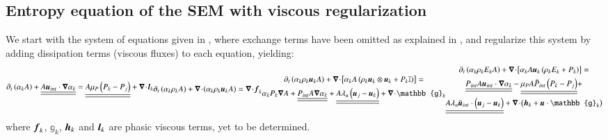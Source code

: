 \subsection{Entropy equation of the SEM with viscous regularization}\label{sec:ent-equ-sem}
%
We start with the system of equations given in , where exchange terms have been omitted as explained in ,
and regularize this system by adding dissipation terms (viscous fluxes) to each equation, yielding:
%
\begin{subequations}\label{eq:sev_equ-with-diss-terms}
\begin{align}\label{eq:sev_equ-with-diss-terms-vf}
\partial_t \left( \alpha_k  A\right) + \underline{\underline{A \mbold u_{int} \cdot \grad \alpha_k}} = \underline{\underline{A \mu_P \left( P_k - P_j \right)}} + \div \mbold l_k 
\end{align}
\begin{align}\label{eq:sev_equ-with-diss-terms-cont}
\partial_t \left( \alpha_k \rho_k A \right) + \div \left( \alpha_k \rho_k \mbold u_k A \right) = \div \mbold f_k
\end{align}
%
\begin{multline}\label{eq:sev_equ-with-diss-terms-mom}
\partial_t \left( \alpha_k \rho_k \mbold u_k A \right) + \div \left[ \alpha_k A \left( \rho_k \mbold u_k \otimes \mbold u_k + P_k \mathbb{I} \right) \right] =\\
\alpha_k P_k \grad A + \underline{\underline{P_{int} A \grad \alpha_k}} + \underline{\underline{A \lambda_u \left( \mbold u_j - \mbold u_k \right)}} + \div \mathbb{g}_k
\end{multline}
%
\begin{multline}\label{eq:sev_equ-with-diss-terms-ener}
\partial_t \left( \alpha_k \rho_k E_k A \right) + \div \left[ \alpha_k A \mbold u_k \left( \rho_k E_k + P_k \right) \right] = \\
\underline{\underline{P_{int} A \mbold u_{int} \cdot \grad \alpha_k}} -
\underline{\underline{\mu_P A  \bar{P}_{int} \left( P_k-P_j \right)}} + \\
\underline{\underline{A \lambda_u \bar{\mbold u}_{int} \cdot \left( \mbold u_j - \mbold u_k \right)}}
+ \div \left( \mbold h_k + \mbold u \cdot \mathbb{g}_k \right)
\end{multline}
\end{subequations}
%
where $\boldsymbol f_k$, $\mathbb{g}_k$, $\boldsymbol h_k$ and $\boldsymbol l_k$ are phasic viscous terms, yet to be determined. 
